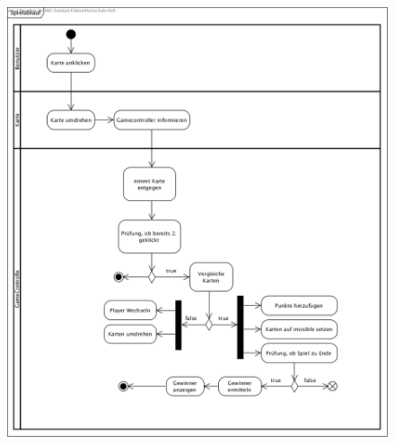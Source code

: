 \begin{figure}[!h]
	\centering
    \includegraphics[width=\textwidth]{./AD_Spielablauf.png}
	\label{layout_gesamt}
\end{figure}





